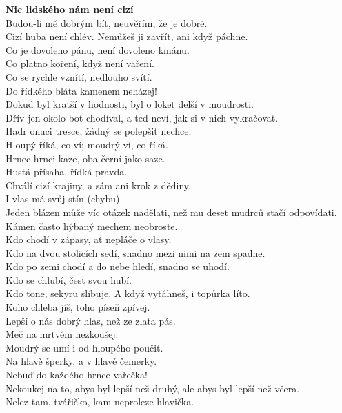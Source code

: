 \begin{multicols}{2}
\noindent
{\large\bf Nic lidského nám není cizí}\\[1 mm]
Budou-li mě dobrým bít, neuvěřím, že je dobré.\\
Cizí huba není chlév. Nemůžeš ji zavřít, ani když páchne.\\
Co je dovoleno pánu, není dovoleno kmánu.\\
Co platno koření, když není vaření.\\
Co se rychle vznítí, nedlouho svítí.\\
Do řídkého bláta kamenem neházej!\\
Dokud byl kratší v hodnosti, byl o loket delší v moudrosti.\\
Dřív jen okolo bot chodíval, a teď neví, jak si v nich vykračovat.\\
Hadr onuci tresce, žádný se polepšit nechce.\\
Hloupý říká, co ví; moudrý ví, co říká.\\
Hrnec hrnci kaze, oba černí jako saze.\\
Hustá přísaha, řídká pravda.\\
Chválí cizí krajiny, a sám ani krok z dědiny.\\
I vlas má svůj stín (chybu).\\
Jeden blázen může víc otázek nadělati, než mu deset mudrců stačí 
odpovídati.\\
Kámen často hýbaný mechem neobroste.\\
Kdo chodí v zápasy, ať nepláče o vlasy.\\
Kdo na dvou stolicích sedí, snadno mezi nimi na zem spadne.\\
Kdo po zemi chodí a do nebe hledí, snadno se uhodí.\\
Kdo se chlubí, čest svou hubí.\\
Kdo tone, sekyru slibuje. A když vytáhneš, i topůrka líto.\\
Koho chleba jíš, toho píseň zpívej.\\
Lepší o nás dobrý hlas, než ze zlata pás.\\
Meč na mrtvém nezkoušej.\\
Moudrý se umí i od hloupého poučit.\\
Na hlavě šperky, a v hlavě čemerky.\\
Nebuď do každého hrnce vařečka!\\
Nekoukej na to, abys byl lepší než druhý, ale abys byl lepší 
než včera.\\
Nelez tam, tvářičko, kam neproleze hlavička.\\

\end{multicols}
